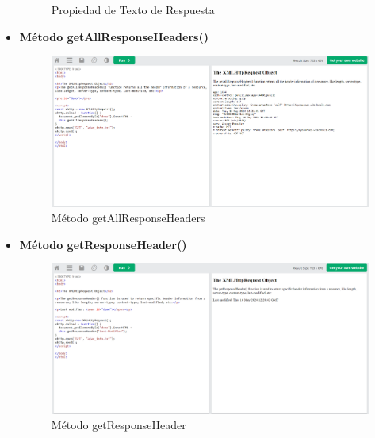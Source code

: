 \documentclass{article}
\begin{document}
\begin{itemize}
\begin{figure}[H]
			\caption{Propiedad de Texto de Respuesta}
		\end{figure}
		\newpage
		\item \textbf{Método getAllResponseHeaders()}
		\begin{figure}[H]
			\centering
			\includegraphics[width=1\textwidth,keepaspectratio]{img/ejemplo12.png}
			\caption{Método getAllResponseHeaders}
		\end{figure}
		\item \textbf{Método getResponseHeader()}
		\begin{figure}[H]
			\centering
			\includegraphics[width=1\textwidth,keepaspectratio]{img/ejemplo13.png}
			\caption{Método getResponseHeader}
		\end{figure}
	\end{itemize}
	\newpage
\end{document}
